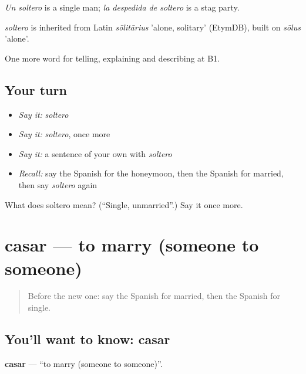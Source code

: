 \emph{Un soltero} is a single man; \emph{la despedida de soltero} is a stag party.

\begin{cousinweb}
\emph{soltero} is inherited from Latin \emph{sōlitārius} 'alone, solitary' (EtymDB), built on \emph{sōlus} 'alone'.
\end{cousinweb}

\begin{grammarlens}[title={What you've built}]
One more word for telling, explaining and describing at B1.
\end{grammarlens}

\subsection*{Your turn}
\begin{itemize}
\raggedright
  \item \emph{Say it:} \emph{soltero}
  \item \emph{Say it:} \emph{soltero}, once more
  \item \emph{Say it:} a sentence of your own with \emph{soltero}
  \item \emph{Recall:} say the Spanish for the honeymoon, then the Spanish for married, then say \emph{soltero} again
\end{itemize}

\begin{tcolorbox}[breakable,colback=teal!4,colframe=teal!35!black,title={Before you move on}]
What does soltero mean? (\textquotedblleft{}Single, unmarried\textquotedblright{}.) Say it once more.
\end{tcolorbox}
\section[casar]{casar — to marry (someone to someone)}

\label{lesson:ES-C549-casar}



\begin{quote}
Before the new one: say the Spanish for married, then the Spanish for single.
\end{quote}

\subsection*{You'll want to know: casar}
\textbf{casar} — \textquotedblleft{}to marry (someone to someone)\textquotedblright{}.


